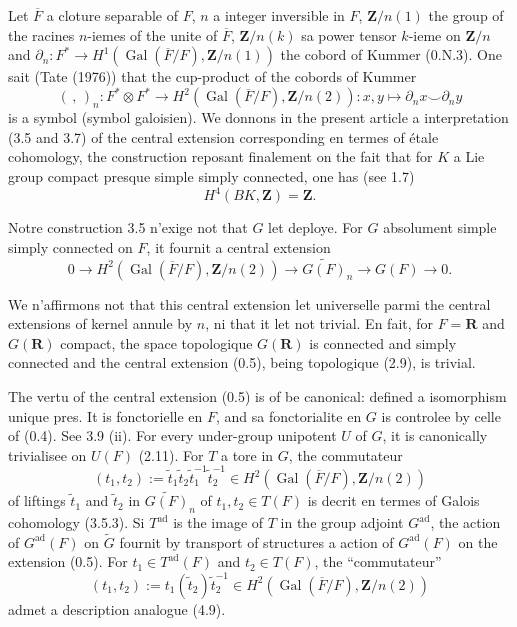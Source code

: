 \documentclass[11pt,a4paper]{article}
\theoremstyle{plain}
\theoremstyle{definition}
\DeclareMathOperator{\Gal}{Gal}
\DeclareMathOperator{\ad}{ad}
\begin{document}
Let $\overline{F}$ a cloture separable of $F$, $n$ a integer inversible in $F$, $\mathbf{Z}/n(1)$ the group of the racines $n$-iemes of the unite of $\overline{F}$, $\mathbf{Z}/n(k)$ sa power tensor $k$-ieme on $\mathbf{Z}/n$ and $\partial_n : F^* \to H^1(\Gal(\overline{F}/F), \mathbf{Z}/n(1))$ the cobord of Kummer (0.N.3). One sait (Tate (1976)) that the cup-product of the cobords of Kummer
\begin{equation}\label{0.3}
(\, , \,)_n : F^* \otimes F^* \to H^2(\Gal(\overline{F}/F), \mathbf{Z}/n(2)) : x, y \mapsto \partial_n x \smile \partial_n y
\end{equation}
is a symbol (symbol galoisien). We donnons in the present article a interpretation (3.5 and 3.7) of the central extension corresponding en termes of étale cohomology, the construction reposant finalement on the fait that for $K$ a Lie group compact presque simple simply connected, one has (see 1.7)
\begin{equation}\label{0.4}
H^4(BK, \mathbf{Z}) = \mathbf{Z}.
\end{equation}

Notre construction 3.5 n'exige not that $G$ let deploye. For $G$ absolument simple simply connected on $F$, it fournit a central extension
\begin{equation}\label{0.5}
0 \to H^2(\Gal(\overline{F}/F), \mathbf{Z}/n(2)) \to \widetilde{G(F)}_n \to G(F) \to 0.
\end{equation}

We n'affirmons not that this central extension let universelle parmi the central extensions of kernel annule by $n$, ni that it let not trivial. En fait, for $F = \mathbf{R}$ and $G(\mathbf{R})$ compact, the space topologique $G(\mathbf{R})$ is connected and simply connected and the central extension (0.5), being topologique (2.9), is trivial.

The vertu of the central extension (0.5) is of be canonical: defined a isomorphism unique pres. It is fonctorielle en $F$, and sa fonctorialite en $G$ is controlee by celle of (0.4). See 3.9 (ii). For every under-group unipotent $U$ of $G$, it is canonically trivialisee on $U(F)$ (2.11). For $T$ a tore in $G$, the commutateur
\[
(t_1, t_2) := \tilde{t}_1 \tilde{t}_2 \tilde{t}_1^{-1} \tilde{t}_2^{-1} \in H^2(\Gal(\overline{F}/F), \mathbf{Z}/n(2))
\]
of liftings $\tilde{t}_1$ and $\tilde{t}_2$ in $\widetilde{G(F)}_n$ of $t_1, t_2 \in T(F)$ is decrit en termes of Galois cohomology (3.5.3). Si $T^{\ad}$ is the image of $T$ in the group adjoint $G^{\ad}$, the action of $G^{\ad}(F)$ on $\widetilde{G}$ fournit by transport of structures a action of $G^{\ad}(F)$ on the extension (0.5). For $t_1 \in T^{\ad}(F)$ and $t_2 \in T(F)$, the ``commutateur''
\[
(t_1, t_2) := t_1(\tilde{t}_2) \tilde{t}_2^{-1} \in H^2(\Gal(\overline{F}/F), \mathbf{Z}/n(2))
\]
admet a description analogue (4.9).
\end{document}
